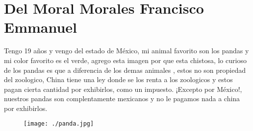\chapter{Del Moral Morales Francisco Emmanuel}
Tengo 19 años y vengo del estado de México, mi animal favorito son los pandas y mi color favorito es el verde, agrego esta imagen por que esta chistosa, lo curioso de los pandas es que a diferencia de los demas animales , estos no son propiedad del zoologico, China tiene una ley donde se los renta a los zoologicos y estos pagan cierta cantidad por exhibirlos, como un impuesto. ¡Excepto por México!, nuestros pandas son complentamente mexicanos y no le pagamos nada a china por exhibirlos.
\begin{figure}[H] %
  \begin{center}                                                                
    \texttt{[image: ./panda.jpg]}                                                                             
  \end{center}                                                                  
\end{figure}  

